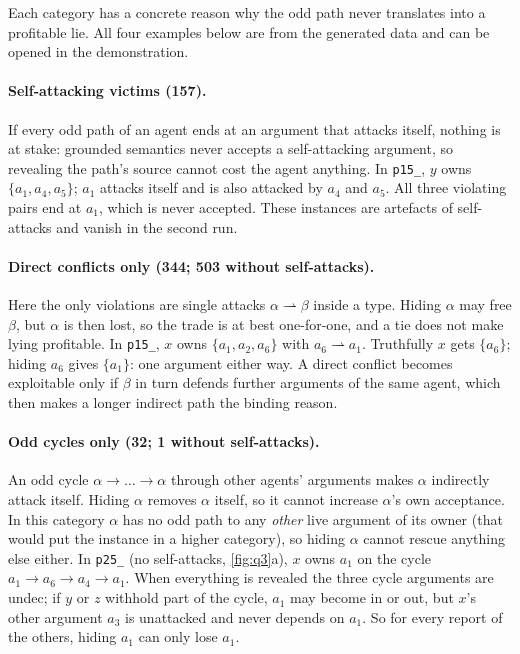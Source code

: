 \documentclass[11pt,a4paper]{article}
\newcommand{\att}{\rightharpoonup}
\newcommand{\code}[1]{{\let\origus\_\renewcommand{\_}{\origus\allowbreak}\texttt{#1}}}
\theoremstyle{definition}
\begin{document}
Each category has a concrete reason why the odd path never translates into a profitable lie. All four
examples below are from the generated data and can be opened in the demonstration.

\paragraph{Self-attacking victims (157).} If every odd path of an agent ends at an argument that
attacks itself, nothing is at stake: grounded semantics never accepts a self-attacking argument, so
revealing the path's source cannot cost the agent anything. In \code{p15\_0019}, $y$ owns
$\{a_1,a_4,a_5\}$; $a_1$ attacks itself and is also attacked by $a_4$ and $a_5$. All three violating
pairs end at $a_1$, which is never accepted. These instances are artefacts of self-attacks and vanish
in the second run.

\paragraph{Direct conflicts only (344; 503 without self-attacks).} Here the only violations are
single attacks $\alpha\att\beta$ inside a type. Hiding $\alpha$ may free $\beta$, but $\alpha$ is then
lost, so the trade is at best one-for-one, and a tie does not make lying profitable. In
\code{p15\_0001}, $x$ owns $\{a_1,a_2,a_6\}$ with $a_6\att a_1$. Truthfully $x$ gets $\{a_6\}$; hiding
$a_6$ gives $\{a_1\}$: one argument either way. A direct conflict becomes exploitable only if $\beta$
in turn defends further arguments of the same agent, which then makes a longer indirect path the
binding reason.

\paragraph{Odd cycles only (32; 1 without self-attacks).} An odd cycle $\alpha\to\dots\to\alpha$
through other agents' arguments makes $\alpha$ indirectly attack itself. Hiding $\alpha$ removes
$\alpha$ itself, so it cannot increase $\alpha$'s own acceptance. In this category $\alpha$ has no odd
path to any \emph{other} live argument of its owner (that would put the instance in a higher
category), so hiding $\alpha$ cannot rescue anything else either. In \code{p25\_0187} (no
self-attacks, \cref{fig:q3}a), $x$ owns $a_1$ on the cycle $a_1\to a_6\to a_4\to a_1$. When everything
is revealed the three cycle arguments are \textsf{undec}; if $y$ or $z$ withhold part of the cycle,
$a_1$ may become \textsf{in} or \textsf{out}, but $x$'s other argument $a_3$ is unattacked and never
depends on $a_1$. So for every report of the others, hiding $a_1$ can only lose $a_1$.
\end{document}
